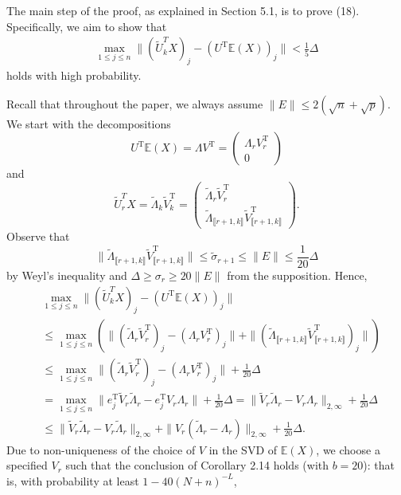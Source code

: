 \documentclass[reqno]{amsart}
\newcommand{\E}{\mathbb{E}}
\newcommand{\T}{\mathrm{T}}
\theoremstyle{plain}
\theoremstyle{definition}
\begin{document}
The main step of the proof, as explained in Section 5.1, is to prove (18). Specifically, we aim to show that 
\begin{align}\label{eq:gmmineq1}
\max_{1\le j \le n}\|(\widetilde U_{k}^T X)_j - (U^\T \E (X))_j\| < \frac{1}{5} \Delta
\end{align}
holds with high probability. 

Recall that throughout the paper, we always assume $\|E\| \le 2(\sqrt n + \sqrt p)$. We start with the decompositions 
$$U^\T \E(X)=\Lambda V^\T = \begin{pmatrix} \Lambda_r V_r^\T \\
0
\end{pmatrix}
$$
and 
$$\widetilde U_{r}^T X = {\widetilde \Lambda_k} {\widetilde V_k^\T} = \begin{pmatrix}
{\widetilde \Lambda_r} {\widetilde V_r^\T}\\
{\widetilde \Lambda_{\llbracket r+1, k\rrbracket}} {\widetilde V_{\llbracket r+1, k\rrbracket}^\T}
\end{pmatrix}.
$$
Observe that $$\|{\widetilde \Lambda_{\llbracket r+1, k\rrbracket}} {\widetilde V_{\llbracket r+1, k\rrbracket}^\T}\| \le \widetilde \sigma_{r+1} \le \|E\| \le \frac{1}{20}\Delta$$
by Weyl's inequality and $\Delta \ge \sigma_r \ge 20 \|E\|$ from the supposition. Hence,
\begingroup
\allowdisplaybreaks
\begin{align}\label{eq:gmmbd}
&\max_{1\le j \le n}\|(\widetilde U_{k}^T X)_j - (U^\T \E (X))_j\|\nonumber \\
&\le \max_{1\le j \le n}\left(\|({\widetilde \Lambda_r} {\widetilde V_r^\T})_j - (\Lambda_r V_r^\T)_j\| +\|({\widetilde \Lambda_{\llbracket r+1, k\rrbracket}} {\widetilde V_{\llbracket r+1, k\rrbracket}^\T})_j\|\right) \nonumber\\
&\le \max_{1\le j \le n}\|({\widetilde \Lambda_r} {\widetilde V_r^\T})_j - (\Lambda_r V_r^\T)_j\| +\frac{1}{20}\Delta\nonumber\\
&=\max_{1\le j \le n }\| e_j^\T{\widetilde V_r} {\widetilde \Lambda_r} - e_j^\T V_r \Lambda_r \|+\frac{1}{20}\Delta =\| {\widetilde V_r} {\widetilde \Lambda_r} - V_r \Lambda_r\|_{2,\infty}+\frac{1}{20}\Delta\nonumber \\
&\le \| {\widetilde V_r} {\widetilde \Lambda_r} - V_r \widetilde{\Lambda}_r\|_{2,\infty} + \| V_r (\widetilde{\Lambda}_r -  \Lambda_r)\|_{2,\infty} + \frac{1}{20}\Delta.
\end{align}
\endgroup
Due to non-uniqueness of the choice of $V$ in the SVD of $\E(X)$, we choose a specified $V_r$ such that the conclusion of Corollary 2.14 holds (with $b=20$): that is, with probability at least $1 - 40(N+n)^{-L}$,
\end{document}
